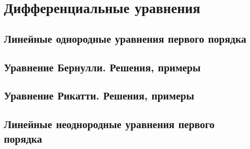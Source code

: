\chapter{Дифференциальные уравнения}

%

\begin{multicols}{2}
    \raggedcolumns
    \section{Линейные однородные уравнения первого порядка}
    \section{Уравнение Бернулли. Решения, примеры}
    \section{Уравнение Рикатти. Решения, примеры}
    \section{Линейные неоднородные уравнения первого порядка}
\end{multicols}